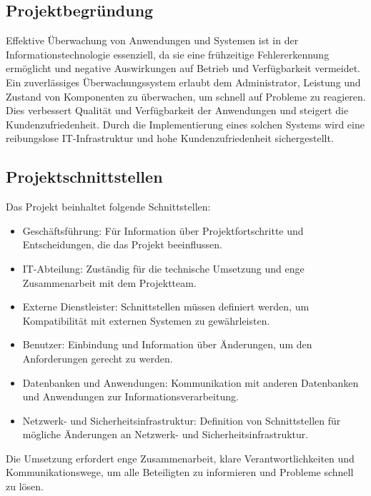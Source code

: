 \begin{flushleft}
\subsection{Projektbegründung}
Effektive Überwachung von Anwendungen und Systemen ist in der Informationstechnologie essenziell,
da sie eine frühzeitige Fehlererkennung ermöglicht und negative Auswirkungen auf Betrieb und Verfügbarkeit vermeidet.
Ein zuverlässiges Überwachungssystem erlaubt dem Administrator, Leistung und Zustand von Komponenten zu überwachen,
um schnell auf Probleme zu reagieren. Dies verbessert Qualität und Verfügbarkeit der Anwendungen und steigert die Kundenzufriedenheit.
Durch die Implementierung eines solchen Systems wird eine reibungslose IT-Infrastruktur und hohe Kundenzufriedenheit sichergestellt.

\subsection{Projektschnittstellen}
Das Projekt beinhaltet folgende Schnittstellen:
\begin{itemize}
\item Geschäftsführung: Für Information über Projektfortschritte und Entscheidungen, die das Projekt beeinflussen.
\item IT-Abteilung: Zuständig für die technische Umsetzung und enge Zusammenarbeit mit dem Projektteam.
\item Externe Dienstleister: Schnittstellen müssen definiert werden, um Kompatibilität mit externen Systemen zu gewährleisten.
\item Benutzer: Einbindung und Information über Änderungen, um den Anforderungen gerecht zu werden.
\item Datenbanken und Anwendungen: Kommunikation mit anderen Datenbanken und Anwendungen zur Informationsverarbeitung.
\item Netzwerk- und Sicherheitsinfrastruktur: Definition von Schnittstellen für mögliche Änderungen an Netzwerk- und Sicherheitsinfrastruktur.
\end{itemize}
Die Umsetzung erfordert enge Zusammenarbeit, klare Verantwortlichkeiten und Kommunikationswege, um alle Beteiligten zu informieren und Probleme schnell zu lösen.



\end{flushleft}
